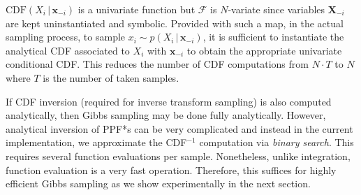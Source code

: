 \documentclass{article} %
\newcommand{\bvec}[1]{\textbf{#1}}
\newcommand{\pr}{p}
\begin{document}
$\text{CDF}(X_i  \,|\, \bvec{x}_{-i})$ is a univariate function but 
$\mathcal{F}$ is $N$-variate since variables $\bvec{X}_{-i}$ are kept uninstantiated and symbolic.
Provided with such a map, in the actual sampling process, 
to sample $x_i \sim \pr(X_i \,|\, \bvec{x}_{-i})$,
it is sufficient to instantiate the analytical CDF associated to $X_i$ with  
$\bvec{x}_{-i}$ to obtain the appropriate univariate conditional CDF.
This reduces the number of CDF computations from $N\cdot T$ to $N$ where 
$T$ is the number of taken samples.

If CDF inversion (required for inverse transform sampling) is also
computed analytically, then Gibbs sampling may be done fully
analytically.  However, analytical inversion of PPF*s can be very
complicated and instead in the current implementation, we approximate
the CDF$^{-1}$ computation via \emph{binary search}. This requires
several function evaluations per sample. Nonetheless, unlike
integration, function evaluation is a very fast operation. Therefore,
this suffices for highly efficient Gibbs sampling as we show
experimentally in the next section.


\end{document}
